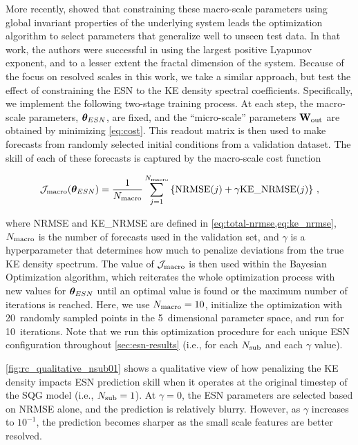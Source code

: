 \documentclass[draft]{agujournal2019}
\newcommand{\citet}{\citeA}
\begin{document}
More recently, \citet{platt_constraining_2023}
showed that constraining these macro-scale
parameters using global invariant properties of the underlying system leads the
optimization algorithm to select parameters that generalize well to unseen test data. In that work, the authors were successful in using the largest positive
Lyapunov exponent, and to a lesser extent the fractal dimension of the system.
Because of the focus on resolved scales in this work, we take a similar approach, but test the effect of constraining the ESN to the KE density spectral coefficients.
Specifically, we implement the following two-stage training process.
At each step, the macro-scale parameters, $\bm{\theta}_{ESN}$, are fixed, and the
``micro-scale'' parameters $\mathbf{W}_\text{out}$ are obtained by minimizing \cref{eq:cost}.
This readout matrix is then used to make forecasts from randomly selected
initial conditions from a validation dataset.
The skill of each of these forecasts is captured by the macro-scale cost
function
\begin{linenomath*}\begin{equation}
    \mathcal{J}_\text{macro}(\bm{\theta}_{ESN}) = \dfrac{1}{N_\text{macro}}
    \sum_{j=1}^{N_\text{macro}}
    \left\{
        \text{NRMSE}(j) + \gamma \text{KE\_NRMSE}(j)
    \right\}
    \label{eq:macro-cost} \, ,
\end{equation}\end{linenomath*}
where NRMSE and KE\_NRMSE are defined in \cref{eq:total-nrmse,eq:ke_nrmse},
$N_\text{macro}$ is the number of forecasts used in the validation set, and $\gamma$ is
a hyperparameter that determines how much to penalize deviations
from the true KE density spectrum.
The value of $\mathcal{J}_\text{macro}$ is then used within the Bayesian Optimization algorithm, which reiterates the whole optimization process with new values for
$\bm{\theta}_{ESN}$ until an optimal value is found or the maximum number of iterations is reached.
Here, we use $N_\text{macro}=10$, initialize the optimization with 20~randomly sampled points in the 5~dimensional parameter space, and run for 10~iterations. Note that we run this optimization procedure for each unique ESN configuration
throughout \cref{sec:esn-results} (i.e., for each $N_\text{sub}$ and each $\gamma$
value).

\cref{fig:rc_qualitative_nsub01} shows a qualitative view of how penalizing the
KE density impacts ESN prediction skill when it operates at the original
timestep of the SQG model (i.e., $N_\text{sub}=1$).
At $\gamma=0$, the ESN parameters are selected based on NRMSE alone, and
the prediction is relatively blurry.
However, as $\gamma$ increases to $10^{-1}$, the prediction becomes sharper as
the small scale features are better resolved.
\end{document}
